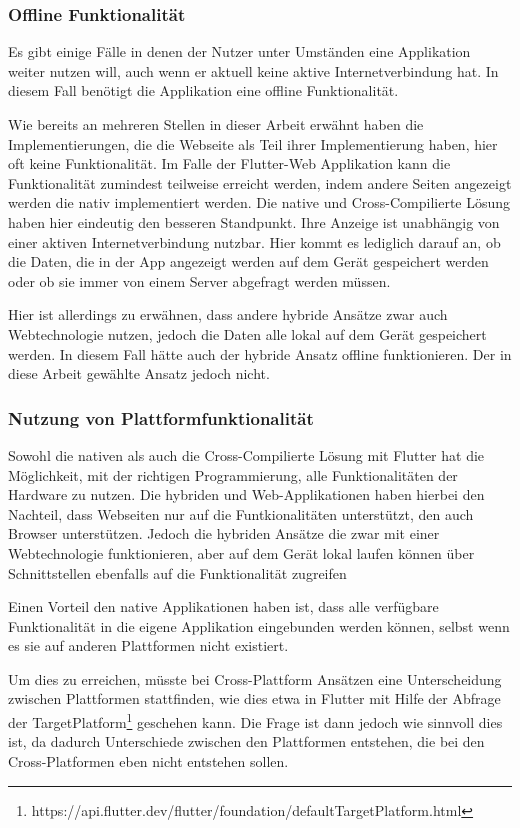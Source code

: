 \subsubsection{Offline Funktionalität}
Es gibt einige Fälle in denen der Nutzer unter Umständen eine Applikation weiter nutzen will, auch wenn er aktuell keine aktive Internetverbindung hat. In diesem Fall benötigt die Applikation eine offline Funktionalität.

Wie bereits an mehreren Stellen in dieser Arbeit erwähnt haben die Implementierungen, die die Webseite als Teil ihrer Implementierung haben, hier oft keine Funktionalität. Im Falle der Flutter-Web Applikation kann die Funktionalität zumindest teilweise erreicht werden, indem andere Seiten angezeigt werden die nativ implementiert werden. Die native und Cross-Compilierte Lösung haben hier eindeutig den besseren Standpunkt. Ihre Anzeige ist unabhängig von einer aktiven Internetverbindung nutzbar. Hier kommt es lediglich darauf an, ob die Daten, die in der App angezeigt werden auf dem Gerät gespeichert werden oder ob sie immer von einem Server abgefragt werden müssen. 

Hier ist allerdings zu erwähnen, dass andere hybride Ansätze zwar auch Webtechnologie nutzen, jedoch die Daten alle lokal auf dem Gerät gespeichert werden. In diesem Fall hätte auch der hybride Ansatz offline funktionieren. Der in diese Arbeit gewählte Ansatz jedoch nicht.

\subsubsection{Nutzung von Plattformfunktionalität}
Sowohl die nativen als auch die Cross-Compilierte Lösung mit Flutter hat die Möglichkeit, mit der richtigen Programmierung, alle Funktionalitäten der Hardware zu nutzen.
Die hybriden und Web-Applikationen haben hierbei den Nachteil, dass Webseiten nur auf die Funtkionalitäten unterstützt, den auch Browser unterstützen. Jedoch die hybriden Ansätze die zwar mit einer Webtechnologie funktionieren, aber auf dem Gerät lokal laufen können über Schnittstellen ebenfalls auf die Funktionalität zugreifen

Einen Vorteil den native Applikationen haben ist, dass alle verfügbare Funktionalität in die eigene Applikation eingebunden werden können, selbst wenn es sie auf anderen Plattformen nicht existiert.

Um dies zu erreichen, müsste bei Cross-Plattform Ansätzen eine Unterscheidung zwischen Plattformen stattfinden, wie dies etwa in Flutter mit Hilfe der Abfrage der TargetPlatform\footnote{https://api.flutter.dev/flutter/foundation/defaultTargetPlatform.html} geschehen kann. Die Frage ist dann jedoch wie sinnvoll dies ist, da dadurch Unterschiede zwischen den Plattformen entstehen, die bei den Cross-Platformen eben nicht entstehen sollen.
